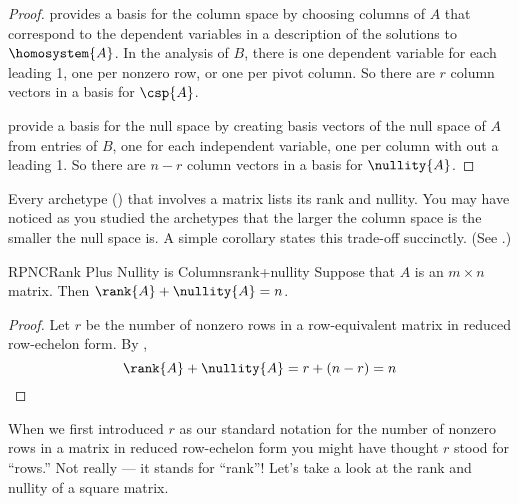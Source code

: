 %
\begin{proof}
 provides a basis for the column space by choosing columns of $A$ that correspond to the dependent variables in a description of the solutions to $\homosystem{A}$.  In the analysis of $B$, there is one dependent variable for each leading 1, one per nonzero row, or one per pivot column.  So there are $r$ column vectors in a basis for $\csp{A}$.\par
%
 provide a basis for the null space by creating basis vectors of the null space of $A$ from entries of $B$, one for each independent variable, one per column with out a leading 1.  So there are $n-r$ column vectors in a basis for $\nullity{A}$.\par
%
\end{proof}
%
Every archetype () that involves a matrix lists its rank and nullity.  You may have noticed as you studied the archetypes that the larger the column space is the smaller the null space is.  A simple corollary states this trade-off succinctly.    (See .)
%
\begin{theorem}{RPNC}{Rank Plus Nullity is Columns}{rank+nullity}
Suppose that $A$ is an $m\times n$ matrix.  Then $\rank{A}+\nullity{A}=n$.
\end{theorem}
%
\begin{proof}
Let $r$ be the number of nonzero rows in a row-equivalent matrix in reduced row-echelon form.
By ,
%
\begin{equation*}
\rank{A}+\nullity{A}= r+(n-r)=n
\end{equation*}
%
\end{proof}
%
When we first introduced $r$ as our standard notation for the number of nonzero rows in a matrix in reduced row-echelon form you might have thought $r$ stood for ``rows.''  Not really --- it stands for ``rank''!
%
%
%
Let's take a look at the rank and nullity of a square matrix.
%
